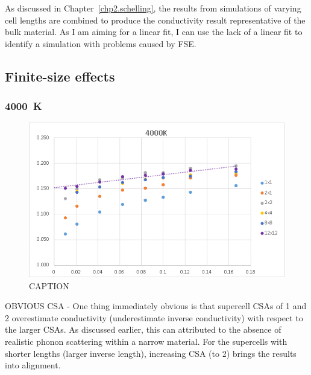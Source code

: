 As discussed in Chapter~\ref{chp2.schelling}, the results from simulations of varying cell lengths are combined to produce the conductivity result representative of the bulk material. As I am aiming for a linear fit, I can use the lack of a linear fit to identify a simulation with problems caused by FSE.
















\pagebreak

\subsection{\label{sec:3.DM.fse}Finite-size effects}

\subsubsection{4000~K}

\begin{figure}[h!]
\includegraphics[width=\linewidth]{Figures/direct_inv_4000.png}
\caption[direct inv 4000]{CAPTION}
\label{fig:direct_inv_4000}
\end{figure}

OBVIOUS CSA - One thing immediately obvious is that supercell CSAs of 1 and 2 overestimate conductivity (underestimate inverse conductivity) with respect to the larger CSAs. As discussed earlier, this can attributed to the absence of realistic phonon scattering within a narrow material. For the supercells with shorter lengths (larger inverse length), increasing CSA (to 2) brings the results into alignment. 

